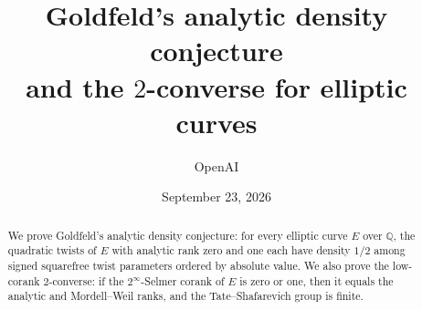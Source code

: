 \documentclass[11pt]{article}
\title{Goldfeld's analytic density conjecture\\and the $2$-converse for elliptic curves}
\author{OpenAI}
\date{September 23, 2026}
\theoremstyle{definition}
\theoremstyle{remark}
\newcommand{\Q}{\mathbb Q}
\theoremstyle{definition}
\numberwithin{equation}{section}
\begin{document}
\maketitle
\begin{abstract}
We prove Goldfeld's analytic density conjecture: for every elliptic curve
$E$ over $\Q$, the quadratic twists of $E$ with analytic rank zero and one
each have density $1/2$ among signed squarefree twist parameters ordered by
absolute value. We also prove the low-corank $2$-converse: if the
$2^\infty$-Selmer corank of $E$ is zero or one, then it equals the analytic
and Mordell--Weil ranks, and the Tate--Shafarevich group is finite.
\end{abstract}
\tableofcontents
\clearpage
















\end{document}
